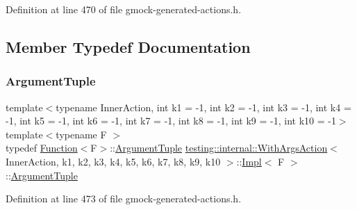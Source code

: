 Definition at line 470 of file gmock-\/generated-\/actions.\+h.



\subsection{Member Typedef Documentation}
\mbox{\label{classtesting_1_1internal_1_1WithArgsAction_1_1Impl_ae75850936c5448a83f79267d6a2f1903}} 
\subsubsection{\texorpdfstring{Argument\+Tuple}{ArgumentTuple}}
{\footnotesize\ttfamily template$<$typename Inner\+Action, int k1 = -\/1, int k2 = -\/1, int k3 = -\/1, int k4 = -\/1, int k5 = -\/1, int k6 = -\/1, int k7 = -\/1, int k8 = -\/1, int k9 = -\/1, int k10 = -\/1$>$ \\
template$<$typename F $>$ \\
typedef \hyperlink{structtesting_1_1internal_1_1Function}{Function}$<$F$>$\+::\hyperlink{classtesting_1_1ActionInterface_af72720d864da4d606629e83edc003511}{Argument\+Tuple} \hyperlink{classtesting_1_1internal_1_1WithArgsAction}{testing\+::internal\+::\+With\+Args\+Action}$<$ Inner\+Action, k1, k2, k3, k4, k5, k6, k7, k8, k9, k10 $>$\+::\hyperlink{classtesting_1_1internal_1_1WithArgsAction_1_1Impl}{Impl}$<$ F $>$\+::\hyperlink{classtesting_1_1ActionInterface_af72720d864da4d606629e83edc003511}{Argument\+Tuple}}



Definition at line 473 of file gmock-\/generated-\/actions.\+h.

\mbox{\label{classtesting_1_1internal_1_1WithArgsAction_1_1Impl_a19859cc3f545dc2a988638d4c2ca1fee}} 
